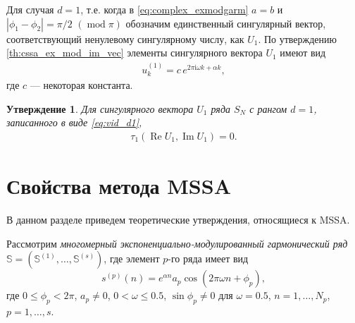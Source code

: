 \documentclass[specialist,
               substylefile = spbu.rtx,
               subf,href,colorlinks=true, 12pt]{disser}
\def\RE{\mathop{\mathrm{Re}}}
\def\mod{\mathop{\mathrm{mod}}}
\def\IM{\mathop{\mathrm{Im}}}
\newtheorem{Th}{Утверждение}
\newtheorem{remark}{Замечание}
\begin{document}
Для случая $d=1$, т.е. когда в \eqref{eq:complex_exmodgarm} $a=b$ и $|\phi_1 - \phi_2| = \pi/2 \,\,(\mod \pi)$ обозначим единственный сингулярный вектор, соответствующий ненулевому сингулярному числу, как $U_1$. 
По утверждению \ref{th:cssa_ex_mod_im_vec} элементы сингулярного вектора $U_1$ имеют вид
\begin{gather} \label{eq:vid_d1}
	u_k^{(1)} = c\,e^{2\pi \mathrm{i} \omega k + \alpha k},
\end{gather}
где $c$ --- некоторая константа.

\begin{Th}  \cite[Утверждение 14]{Zhornikova2016} \label{th:th_tau_cssa_d1}
Для сингулярного вектора $U_1$ ряда $S_N$ с рангом $d=1$, записанного в виде \eqref{eq:vid_d1}, 
 \begin{gather*} 
 \tau_1(\RE U_1, \IM U_1)=0.
 \end{gather*}
\end{Th}


\section{Свойства метода MSSA}
\label{sec:mssa_theory}
В данном разделе приведем теоретические утверждения, относящиеся к MSSA.

Рассмотрим \textit{многомерный экспоненциально-модулированный гармонический ряд} $\mathbb{S} = \left(\mathbb{S}^{(1)},
 \ldots,\mathbb{S}^{(s)}\right)$, где элемент $p$-го ряда имеет вид
\begin{equation} \label{eq:em_mssa}
 s^{(p)}(n) = e^{\alpha n} a_p\cos(2\pi\omega n + \phi_p),
\end{equation}
где $0 \leqslant\phi_p < 2\pi$, $a_p \not = 0$, $0<\omega \leqslant 0.5$, $\sin \phi_p \not = 0$ для $\omega = 0.5$, $n=1,\ldots,N_p$, $p=1,\ldots,s$.
\end{document}
